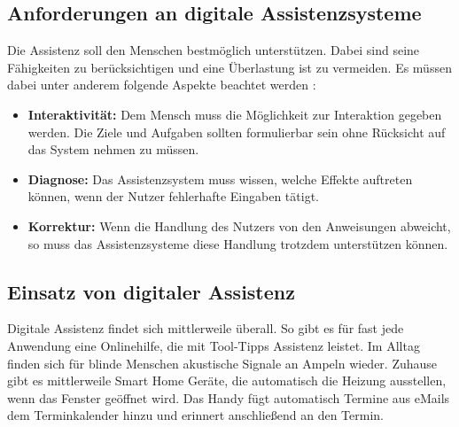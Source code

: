 \subsection{Anforderungen an digitale Assistenzsysteme}
Die Assistenz soll den Menschen bestmöglich unterstützen. Dabei sind seine Fähigkeiten zu berücksichtigen und eine Überlastung ist zu vermeiden. Es müssen dabei unter anderem folgende Aspekte beachtet werden \cite{Ludwig}:
\begin{itemize}
\item \textbf{Interaktivität:} Dem Mensch muss die Möglichkeit zur Interaktion gegeben werden. Die Ziele und Aufgaben sollten formulierbar sein ohne Rücksicht auf das System nehmen zu müssen.
\item \textbf{Diagnose:} Das Assistenzsystem muss wissen, welche Effekte auftreten können, wenn der Nutzer  fehlerhafte Eingaben tätigt.
\item \textbf{Korrektur:} Wenn die Handlung des Nutzers  von den Anweisungen abweicht, so muss das Assistenzsysteme diese Handlung trotzdem unterstützen können.
\end{itemize}

\subsection{Einsatz von digitaler Assistenz}
\label{2:Einsatz-Assistenz}
Digitale Assistenz findet sich mittlerweile überall. So gibt es für fast jede Anwendung eine Onlinehilfe, die mit Tool-Tipps Assistenz leistet. Im Alltag finden sich für blinde Menschen akustische Signale an Ampeln wieder. Zuhause gibt es mittlerweile Smart Home Geräte, die automatisch die Heizung ausstellen, wenn das Fenster geöffnet wird. Das Handy fügt automatisch Termine aus eMails dem Terminkalender hinzu und erinnert anschließend an den Termin.


